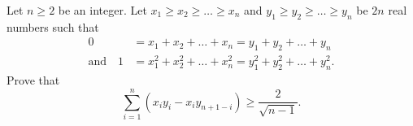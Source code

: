 Let $n\geq2$ be an integer. Let $x_1\geq x_2\geq\dots\geq x_n$ and $y_1\geq y_2\geq\dots\geq y_n$ be $2n$ real numbers such that
\begin{align*}
	0 &= x_1+x_2+\dots+x_n=y_1+y_2+\dots+y_n \\
	\text{and}\quad1 &= x_1^2+x_2^2+\dots+x_n^2=y_1^2+y_2^2+\dots+y_n^2.
\end{align*}
Prove that
\[
	\sum_{i=1}^n(x_iy_i-x_iy_{n+1-i})\geq\frac{2}{\sqrt{n-1}}.
\]
